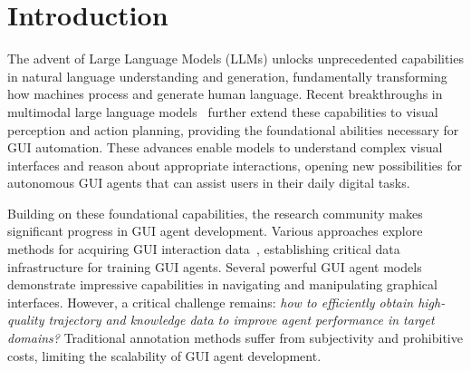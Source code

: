 \section{Introduction}

The advent of Large Language Models (LLMs) unlocks unprecedented capabilities in natural language understanding and generation, fundamentally transforming how machines process and generate human language. Recent breakthroughs in multimodal large language models~\cite{Bai2025Qwen3VL, comanici2025gemini_gemini25, gpt5, claudeopus45, guo2025seed1_seed15} further extend these capabilities to visual perception and action planning, providing the foundational abilities necessary for GUI automation. These advances enable models to understand complex visual interfaces and reason about appropriate interactions, opening new possibilities for autonomous GUI agents that can assist users in their daily digital tasks.

Building on these foundational capabilities, the research community makes significant progress in GUI agent development. Various approaches explore methods for acquiring GUI interaction data~\cite{gao2024mobileviews, rawles2023androidinthewild, liu2025scalecua, wang2025opencua}, establishing critical data infrastructure for training GUI agents. Several powerful GUI agent models~\cite{qin2025ui_uitars1, wang2025ui_uitars2, ye2025mobile_mobileagentv3, zeng2025uitron} demonstrate impressive capabilities in navigating and manipulating graphical interfaces. However, a critical challenge remains: \textit{how to efficiently obtain high-quality trajectory and knowledge data to improve agent performance in target domains?} Traditional annotation methods suffer from subjectivity and prohibitive costs, limiting the scalability of GUI agent development.

